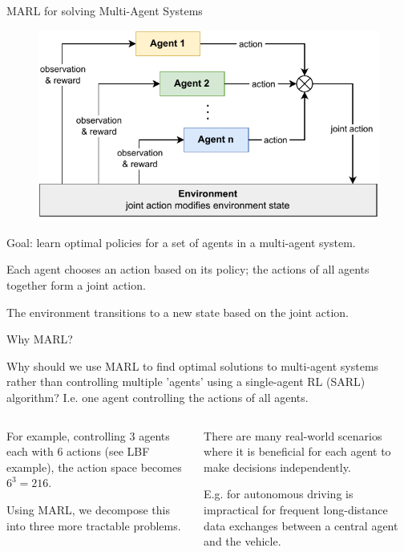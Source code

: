 \begin{frame}{MARL for solving Multi-Agent Systems}

    \begin{figure}
        \centering
        \includegraphics[width=.6\textwidth]{images/chapter_1/MARL-loop.pdf}
    \end{figure} 

    \vspace{-.5em}

    \blist
        \item Goal: learn optimal policies for a set of agents in a multi-agent system.
        \item Each agent chooses an action based on its policy; the actions of all agents together form a joint action. 
        \item The environment transitions to a new state based on the joint action.
    \elist
\end{frame}

\begin{frame}{Why MARL?}
\small

 Why should we use MARL to find optimal solutions to multi-agent systems rather than controlling multiple 'agents' using a single-agent RL (SARL) algorithm? I.e. one agent controlling the actions of all agents. 

\vspace{10pt}
  \begin{columns}[T]
    \begin{column}{0.45\textwidth}
        \blist
            \item For example, controlling $3$ agents each with $6$ actions (see LBF example), the action space becomes $6^3 = 216$.
            \item Using MARL, we decompose this into three more tractable problems. 
        \elist
    \end{column}
    \hspace{10pt}
    \begin{column}{0.45\textwidth}
        \blist
            \item There are many real-world scenarios where it is beneficial for each agent to make decisions independently.
            \item E.g. for autonomous driving is impractical for frequent long-distance data exchanges between a central agent and the vehicle.
        \elist
    \end{column}
\end{columns}
\end{frame}

